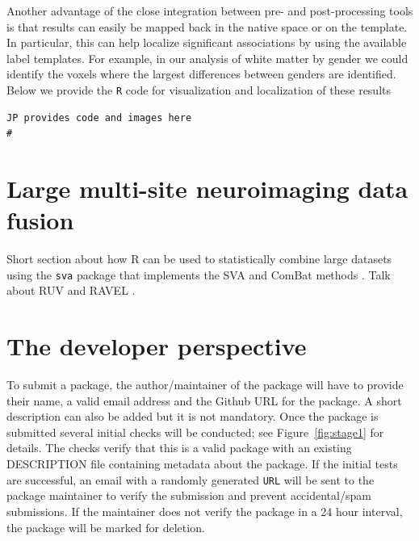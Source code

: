 \documentclass[]{elsarticle} %
\begin{document}
Another  advantage  of the close integration between pre- and post-processing tools is that results can easily be mapped back in the native space or on the template. In particular, this can help localize significant associations by using the available label templates. For example, in our analysis of white matter by gender we could identify the voxels where the largest differences between genders are identified.  Below we provide the  \texttt{R} code  for visualization  and  localization of these results

\color{blue}
\begin{verbatim}
JP provides code and images here
# 
\end{verbatim}
\color{black}

\section{Large multi-site neuroimaging data fusion}\label{sec:datafusion}
Short section about how R can be used to statistically combine large datasets using the \texttt{sva} package \citep{svapackage} that implements the SVA and ComBat methods \citep{combat}. Talk about RUV and RAVEL \citep{ravel}. 

\section{The developer perspective}\label{section:dev_perspective}
To submit a package, the author/maintainer of the package will have to provide their name, a valid email address and the Github URL for the package. A short description can also be added but it is not mandatory. Once the package is submitted several initial checks will be conducted; see Figure~\ref{fig:stage1} for details. The checks verify that this is a valid package with an existing DESCRIPTION file containing metadata about the package. If the initial tests are successful, an email with a randomly generated \texttt{URL} will be sent to the package maintainer to verify the submission and prevent accidental/spam submissions. If the maintainer does not verify the package in a 24 hour interval, the package will be marked for deletion. 
\end{document}
